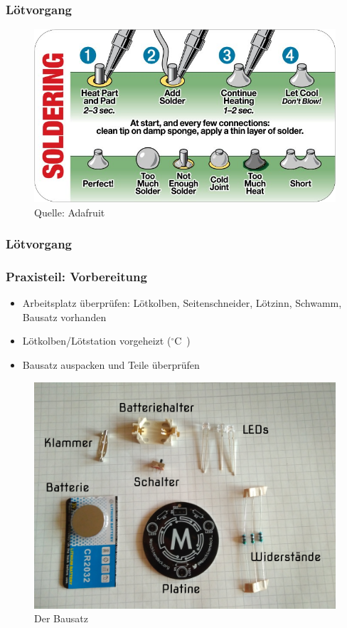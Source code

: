 \documentclass[10pt]{beamer}
\begin{document}
	\begin{frame}
	\frametitle{Lötvorgang}
	\begin{figure}[hbtp]
		\centering
		\includegraphics[width=\linewidth]{images/solder.png}
		\caption{Quelle: Adafruit}
	\end{figure}
	\end{frame}

	\begin{frame}
		\frametitle{Lötvorgang}
	\end{frame}

	\begin{frame}
	\frametitle{Praxisteil: Vorbereitung}
	\begin{itemize}
		\item{Arbeitsplatz überprüfen: Lötkolben, Seitenschneider, Lötzinn, Schwamm, Bausatz vorhanden}
		\item{Lötkolben/Lötstation vorgeheizt (\unit[350]{$^\circ$C})}
		\item{Bausatz auspacken und Teile überprüfen}
	\end{itemize}
	\begin{figure}[hbtp]
		\centering
		\includegraphics[width=\linewidth*5/10]{images/badge.jpg}
		\caption{Der Bausatz}
	\end{figure}
	\end{frame}
\end{document}

